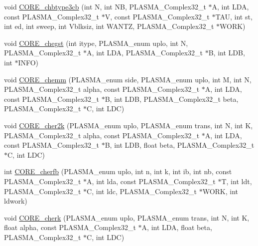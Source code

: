 \begin{DoxyCompactItemize}
\item 
void \hyperlink{group__CORE__PLASMA__Complex32__t_gaaf01a014d45410ea53191965c7a4c3a2_gaaf01a014d45410ea53191965c7a4c3a2}{C\+O\+R\+E\+\_\+chbtype3cb} (int N, int N\+B, P\+L\+A\+S\+M\+A\+\_\+\+Complex32\+\_\+t $\ast$A, int L\+D\+A, const P\+L\+A\+S\+M\+A\+\_\+\+Complex32\+\_\+t $\ast$V, const P\+L\+A\+S\+M\+A\+\_\+\+Complex32\+\_\+t $\ast$T\+A\+U, int st, int ed, int sweep, int Vblksiz, int W\+A\+N\+T\+Z, P\+L\+A\+S\+M\+A\+\_\+\+Complex32\+\_\+t $\ast$W\+O\+R\+K)
\item 
void \hyperlink{group__CORE__PLASMA__Complex32__t_ga1624c78b2bb1eea77e119ff81558ff58_ga1624c78b2bb1eea77e119ff81558ff58}{C\+O\+R\+E\+\_\+chegst} (int itype, P\+L\+A\+S\+M\+A\+\_\+enum uplo, int N, P\+L\+A\+S\+M\+A\+\_\+\+Complex32\+\_\+t $\ast$A, int L\+D\+A, P\+L\+A\+S\+M\+A\+\_\+\+Complex32\+\_\+t $\ast$B, int L\+D\+B, int $\ast$I\+N\+F\+O)
\item 
void \hyperlink{group__CORE__PLASMA__Complex32__t_ga039e9f2a9f753f52023537c054acb94a_ga039e9f2a9f753f52023537c054acb94a}{C\+O\+R\+E\+\_\+chemm} (P\+L\+A\+S\+M\+A\+\_\+enum side, P\+L\+A\+S\+M\+A\+\_\+enum uplo, int M, int N, P\+L\+A\+S\+M\+A\+\_\+\+Complex32\+\_\+t alpha, const P\+L\+A\+S\+M\+A\+\_\+\+Complex32\+\_\+t $\ast$A, int L\+D\+A, const P\+L\+A\+S\+M\+A\+\_\+\+Complex32\+\_\+t $\ast$B, int L\+D\+B, P\+L\+A\+S\+M\+A\+\_\+\+Complex32\+\_\+t beta, P\+L\+A\+S\+M\+A\+\_\+\+Complex32\+\_\+t $\ast$C, int L\+D\+C)
\item 
void \hyperlink{group__CORE__PLASMA__Complex32__t_gac07e5bbc36930e45e02c0d2754dff3be_gac07e5bbc36930e45e02c0d2754dff3be}{C\+O\+R\+E\+\_\+cher2k} (P\+L\+A\+S\+M\+A\+\_\+enum uplo, P\+L\+A\+S\+M\+A\+\_\+enum trans, int N, int K, P\+L\+A\+S\+M\+A\+\_\+\+Complex32\+\_\+t alpha, const P\+L\+A\+S\+M\+A\+\_\+\+Complex32\+\_\+t $\ast$A, int L\+D\+A, const P\+L\+A\+S\+M\+A\+\_\+\+Complex32\+\_\+t $\ast$B, int L\+D\+B, float beta, P\+L\+A\+S\+M\+A\+\_\+\+Complex32\+\_\+t $\ast$C, int L\+D\+C)
\item 
int \hyperlink{group__CORE__PLASMA__Complex32__t_ga0930505da4c6917a906a80ff5211b5bf_ga0930505da4c6917a906a80ff5211b5bf}{C\+O\+R\+E\+\_\+cherfb} (P\+L\+A\+S\+M\+A\+\_\+enum uplo, int n, int k, int ib, int nb, const P\+L\+A\+S\+M\+A\+\_\+\+Complex32\+\_\+t $\ast$A, int lda, const P\+L\+A\+S\+M\+A\+\_\+\+Complex32\+\_\+t $\ast$T, int ldt, P\+L\+A\+S\+M\+A\+\_\+\+Complex32\+\_\+t $\ast$C, int ldc, P\+L\+A\+S\+M\+A\+\_\+\+Complex32\+\_\+t $\ast$W\+O\+R\+K, int ldwork)
\item 
void \hyperlink{group__CORE__PLASMA__Complex32__t_gad3085a22b09fa5edc9d7536a58f3d15d_gad3085a22b09fa5edc9d7536a58f3d15d}{C\+O\+R\+E\+\_\+cherk} (P\+L\+A\+S\+M\+A\+\_\+enum uplo, P\+L\+A\+S\+M\+A\+\_\+enum trans, int N, int K, float alpha, const P\+L\+A\+S\+M\+A\+\_\+\+Complex32\+\_\+t $\ast$A, int L\+D\+A, float beta, P\+L\+A\+S\+M\+A\+\_\+\+Complex32\+\_\+t $\ast$C, int L\+D\+C)

\end{DoxyCompactItemize}
